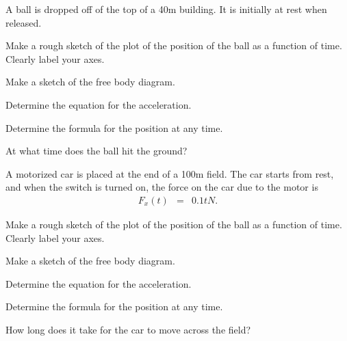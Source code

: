 \begin{problem}
\item A ball is dropped off of the top of a 40m building. It is
  initially at rest when released.
  \begin{subproblem}
    \item Make a rough sketch of the plot of the position of the ball
      as a function of time. Clearly label your axes.

      \vfill

    \item Make a sketch of the free body diagram.
      \vfill

    \item Determine the equation for the acceleration.
      \vspace{10em}

      \clearpage

    \item Determine the formula for the position at any time.
      \vfill
      \vfill
    \item At what time does the ball hit the ground?
      \vfill
  \end{subproblem}
  \clearpage

\item A motorized car is placed at the end of a 100m field. The car
  starts from rest, and when the switch is turned on, the force on the
  car due to the motor is
  \begin{eqnarray*}
    F_x(t) & = & 0.1 t N.
  \end{eqnarray*}
  \begin{subproblem}
    \item Make a rough sketch of the plot of the position of the ball
      as a function of time. Clearly label your axes.
      \vfill
    \item Make a sketch of the free body diagram.
      \vspace{7em}
    \item Determine the equation for the acceleration.
      \vspace{5em}
      \clearpage
    \item Determine the formula for the position at any time.
      \vfill
      \vfill
    \item How long does it take for the car to move across the field?
      \vfill
  \end{subproblem}

\end{problem}

